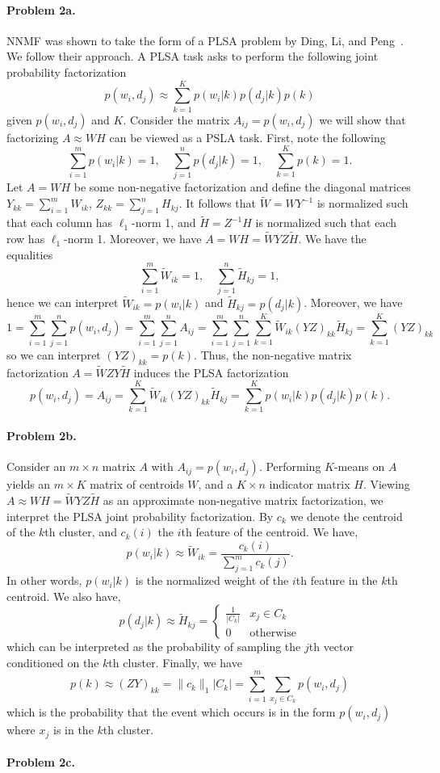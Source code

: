 \documentclass[12pt]{article}
\begin{document}
\paragraph{Problem 2a.}
NNMF was shown to take the form of a PLSA problem by Ding, Li, and Peng~\cite{Ding2008}. We follow their approach.
A PLSA task asks to perform the following joint probability factorization \[p(w_i, d_j) \approx \sum_{k=1}^K p(w_i | k) p(d_j | k) p(k) \] given $p(w_i, d_j)$ and $K$. Consider the matrix $A_{ij} = p(w_i, d_j)$ we will show that factorizing $A \approx WH$ can be viewed as a PSLA task.
First, note the following \[ \sum_{i=1}^m p(w_i|k) = 1, \quad  \sum_{j=1}^n p(d_j|k) = 1, \quad \sum_{k=1}^K p(k) = 1.\]
Let $A=WH$ be some non-negative factorization and define the diagonal matrices $Y_{kk} = \sum_{i=1}^m W_{ik}$, $Z_{kk} = \sum_{j=1}^n H_{kj}$.
It follows that $\tilde{W} = WY^{-1}$ is normalized such that each column has $\ell_1$-norm 1, and $\tilde{H} = Z^{-1}H$ is normalized such that each row has $\ell_1$-norm 1. Moreover, we have $A = WH = \tilde{W} Y Z \tilde{H}$.
We have the equalities \[\sum_{i=1}^m \tilde{W}_{ik} = 1, \quad \sum_{j=1}^n \tilde{H}_{kj} = 1,\] hence we can interpret $\tilde{W}_{ik} = p(w_i|k)$ and $\tilde{H}_{kj} = p(d_j|k)$.
Moreover, we have \[1 = \sum_{i=1}^m \sum_{j=1}^n p(w_i, d_j) = \sum_{i=1}^m \sum_{j=1}^n A_{ij} = \sum_{i=1}^m \sum_{j=1}^n \sum_{k=1}^K \tilde{W}_{ik} \left( YZ \right)_{kk} \tilde{H}_{kj} = \sum_{k=1}^K \left(Y Z \right)_{kk}\] so we can interpret $(YZ)_{kk} = p(k)$.
Thus, the non-negative matrix factorization $A = \tilde{W} ZY \tilde{H}$ induces the PLSA factorization \[p(w_i, d_j) = A_{ij} = \sum_{k=1}^K \tilde{W}_{ik} \left(YZ \right)_{kk} \tilde{H}_{kj} = \sum_{k=1}^K p(w_i|k)p(d_j|k)p(k). \]

\paragraph{Problem 2b.}
Consider an $m \times n$ matrix $A$ with $A_{ij} = p(w_i, d_j)$. Performing $K$-means on $A$ yields an $m \times K$ matrix of centroids $W$, and a $K \times n$ indicator matrix $H$.
Viewing $A \approx WH = \tilde{W}YZ\tilde{H}$ as an approximate non-negative matrix factorization, we interpret the PLSA joint probability factorization. By $c_k$ we denote the centroid of the $k$th cluster, and $c_k(i)$ the $i$th feature of the centroid. We have,
\[p(w_i | k) \approx \tilde{W}_{ik} = \frac{c_k(i)}{\sum_{j=1}^m c_k(j)}.  \]
In other words, $p(w_i | k)$ is the normalized weight of the $i$th feature in the $k$th centroid.
We also have, \[ p(d_j | k) \approx \tilde{H}_{kj} = \begin{cases} \frac{1}{|C_k|} & x_j \in C_k \\ 0 & \text{otherwise} \end{cases}\] which can be interpreted as the probability of sampling the $j$th vector conditioned on the $k$th cluster.
Finally, we have \[p(k) \approx (ZY)_{kk} = \|c_k\|_1 |C_k| = \sum_{i=1}^m \sum_{x_j \in C_k} p(w_i, d_j)\] which is the probability that the event which occurs is in the form $p(w_i, d_j)$ where $x_j$ is in the $k$th cluster.

\paragraph{Problem 2c.}



\end{document}
